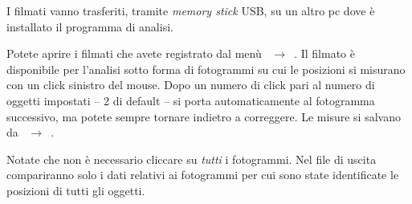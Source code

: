 \documentclass{lab1-article}
\begin{document}
\begin{article}
I filmati vanno trasferiti, tramite \emph{memory stick} USB, su un altro pc
dove \`e installato il programma di analisi.




Potete aprire i filmati che avete registrato dal men\`u
~$\rightarrow$~.
Il filmato \`e disponibile per l'analisi sotto forma di fotogrammi su
cui le posizioni si misurano con un click sinistro del mouse.
Dopo un numero di click pari al numero di oggetti impostati 
-- 2 di default -- si porta automaticamente al fotogramma successivo, ma
potete sempre tornare indietro a correggere. Le misure si salvano da
~$\rightarrow$~.

Notate che non \`e necessario cliccare su \emph{tutti} i fotogrammi.
Nel file di uscita compariranno solo i dati relativi ai fotogrammi per cui
sono state identificate le posizioni di tutti gli oggetti.
\end{article}
\end{document}

